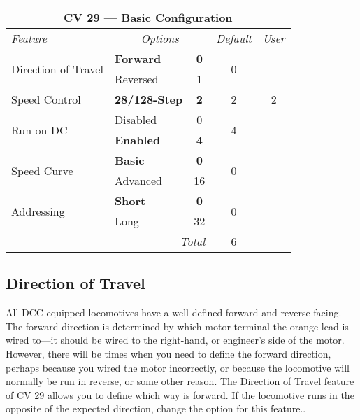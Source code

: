 \documentclass[12pt,letterpaper,draft]{memoir} %
\begin{document}
\label{CV29}
\begin{center}
\begin{tabular}{|l|lc|c|c|}
\hline
\multicolumn{5}{|c|}{\textbf{CV 29 --- Basic Configuration}} \\ \hline \hline
\textit{Feature} & \multicolumn{2}{c|}{\textit{Options}} & \textit{Default} & \textit{User} \\ \hline
\multirow{2}{*}{Direction of Travel} & \textbf{Forward}	 & \textbf{0} & \multirow{2}{*}{0} &\\
& Reversed & 1 & & \\ \hline
Speed Control & \textbf{28/128-Step} & \textbf{2} & 2 & 2\\ \hline
\multirow{2}{*}{Run on DC} & Disabled & 0 & \multirow{2}{*}{4} & \\
& \textbf{Enabled} & \textbf{4} & & \\ \hline
\multirow{2}{*}{Speed Curve} & \textbf{Basic} & \textbf{0}  & \multirow{2}{*}{0}& \\
& Advanced & 16 & &\\ \hline
\multirow{2}{*}{Addressing} & \textbf{Short} & \textbf{0} & \multirow{2}{*}{0} & \\
& Long & 32 & &\\ \hline \hline
\multicolumn{3}{|r|}{\textit{Total}} & 6 &\\ \hline
\end{tabular}
\end{center}

\subsection{Direction of Travel}
\label{DC29directionoftravel}
All DCC-equipped locomotives have a well-defined forward and reverse facing. The forward direction is determined by which motor terminal the orange lead is wired to---it should be wired to the right-hand, or engineer's side of the motor. However, there will be times when you need to define the forward direction, perhaps because you wired the motor incorrectly, or because the locomotive will normally be run in reverse, or some other reason. The Direction of Travel feature of CV 29 allows you to define which way is forward. If the locomotive runs in the opposite of the expected direction, change the option for this feature..
\end{document}
